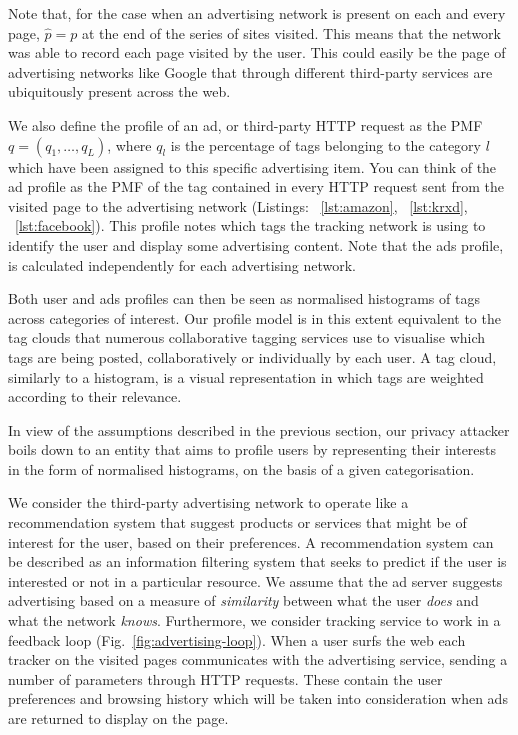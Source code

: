 Note that, for the case when an advertising network is present on each and every page, $\hat{p} = p$ at the end of the series of sites visited. This means that the network was able to record each page visited by the user. This could easily be the page of advertising networks like Google that through different third-party services are ubiquitously present across the web.

We also define the profile of an ad, or third-party HTTP request as the PMF $q =(q_1,\ldots, q_L)$, where $q_l$ is the percentage of tags belonging to the category $l$ which have been assigned to this specific advertising item. You can think of the ad profile as the PMF of the tag contained in every HTTP request sent from the visited page to the advertising network (Listings: ~\ref{lst:amazon}, ~\ref{lst:krxd}, ~\ref{lst:facebook}). This profile notes which tags the tracking network is using to identify the user and display some advertising content. Note that the ads profile, is calculated independently for each advertising network.

Both user and ads profiles can then be seen as normalised histograms of tags across categories of interest. Our profile model is in this extent equivalent to the tag clouds that numerous collaborative tagging services use to visualise which tags are being posted, collaboratively or individually by each user. A tag cloud, similarly to a histogram, is a visual representation in which tags are weighted according to their relevance.

In view of the assumptions described in the previous section, our privacy attacker boils down to an entity that aims to profile users by representing their interests in the form of normalised histograms, on the basis of a given categorisation.

We consider the third-party advertising network to operate like a recommendation system that suggest products or services that might be of interest for the user, based on their preferences. A recommendation system can be described as an information filtering system that seeks to predict if the user is interested or not in a particular resource. We assume that the ad server suggests advertising based on a measure of \emph{similarity} between what the user \emph{does} and what the network \emph{knows}. Furthermore, we consider tracking service to work in a feedback loop (Fig.~\ref{fig:advertising-loop}). When a user surfs the web each tracker on the visited pages communicates with the advertising service, sending a number of parameters through HTTP requests. These contain the user preferences and browsing history which will be taken into consideration when ads are returned to display on the page.

